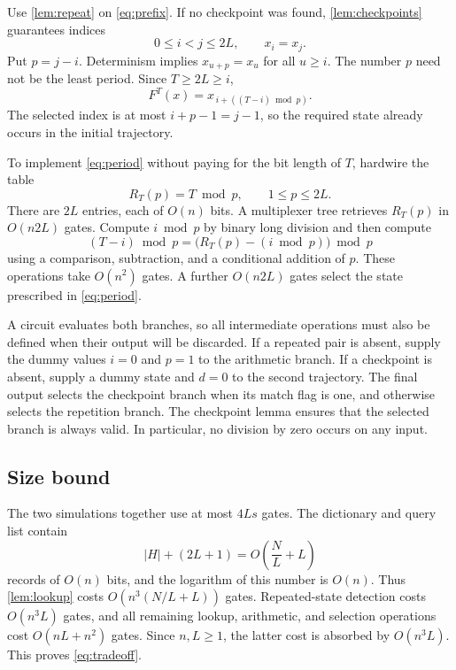 \documentclass[11pt]{article}
\theoremstyle{definition}
\theoremstyle{remark}
\numberwithin{equation}{section}
\begin{document}
Use \cref{lem:repeat} on \cref{eq:prefix}.  If no checkpoint was found,
\cref{lem:checkpoints} guarantees indices
\[
  0\leq i<j\leq 2L,\qquad x_i=x_j.
\]
Put $p=j-i$.  Determinism implies $x_{u+p}=x_u$ for all $u\geq i$.
The number $p$ need not be the least period.  Since $T\geq 2L\geq i$,
\begin{equation}\label{eq:period}
  F^T(x)=x_{\,i+((T-i)\bmod p)}.
\end{equation}
The selected index is at most $i+p-1=j-1$, so the required state already
occurs in the initial trajectory.

To implement \cref{eq:period} without paying for the bit length of $T$,
hardwire the table
\begin{equation}\label{eq:residue-table}
  R_T(p)=T\bmod p,\qquad 1\leq p\leq 2L.
\end{equation}
There are $2L$ entries, each of $O(n)$ bits.  A multiplexer tree retrieves
$R_T(p)$ in $O(n2L)$ gates.  Compute $i\bmod p$ by binary long division
and then compute
\[
  (T-i)\bmod p
    =\bigl(R_T(p)-(i\bmod p)\bigr)\bmod p
\]
using a comparison, subtraction, and a conditional addition of $p$.
These operations take $O(n^2)$ gates.  A further $O(n2L)$ gates select the
state prescribed in \cref{eq:period}.

A circuit evaluates both branches, so all intermediate operations must
also be defined when their output will be discarded.  If a repeated pair
is absent, supply the dummy values $i=0$ and $p=1$ to the arithmetic
branch.  If a checkpoint is absent, supply a dummy state and $d=0$ to
the second trajectory.  The final output selects the checkpoint branch
when its match flag is one, and otherwise selects the repetition branch.
The checkpoint lemma ensures that the selected branch is always valid.
In particular, no division by zero occurs on any input.

\subsection{Size bound}

The two simulations together use at most $4Ls$ gates.  The dictionary
and query list contain
\[
  |H|+(2L+1)=O\!\left(\frac{N}{L}+L\right)
\]
records of $O(n)$ bits, and the logarithm of this number is $O(n)$.
Thus \cref{lem:lookup} costs
$O(n^3(N/L+L))$ gates.  Repeated-state detection costs $O(n^3L)$ gates,
and all remaining lookup, arithmetic, and selection operations cost
$O(nL+n^2)$ gates.  Since $n,L\geq 1$, the latter cost is absorbed by
$O(n^3L)$.  This proves \cref{eq:tradeoff}.
\end{document}
